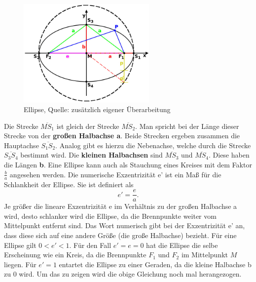 \begin{figure}[h]                                                                           %
	\centering                                                                            	%
	\includegraphics[width=0.6\textwidth]{./images/ellipse_new.jpg}                         %
	\caption[Ellipse]{Ellipse, Quelle: \cite{Wiki:Elli} zusätzlich eigener Überarbeitung}          %
	\label{fig:ellipse}                                                                     %
\end{figure}                                                                              	%
Die Strecke \ensuremath{\overline{MS_{1}}} ist gleich der Strecke \ensuremath{\overline{MS_{2}}}. Man spricht bei der Länge dieser Strecke von der \textbf{großen Halbachse a}. Beide Strecken ergeben zusammen die Hauptachse \ensuremath{\overline{S_{1}S_{2}}}. Analog gibt es hierzu die Nebenachse, welche durch die Strecke \ensuremath{\overline{S_{3}S_{4}}} bestimmt wird. Die \textbf{kleinen Halbachsen} sind \ensuremath{\overline{MS_{3}}} und \ensuremath{\overline{MS_{4}}}. Diese haben die Längen \textbf{b}. Eine Ellipse kann auch als Stauchung eines Kreises mit dem Faktor \ensuremath{\frac{b}{a}} angesehen werden. 
\newpar
Die numerische Exzentrizität e' ist ein Maß für die Schlankheit der Ellipse. Sie ist definiert als
\begin{equation}
	e'=\frac{e}{a}.
\end{equation}
Je größer die lineare Exzentrizität e im Verhältnis zu der großen Halbachse a wird, desto schlanker wird die Ellipse, da die Brennpunkte weiter vom Mittelpunkt entfernt sind. Das Wort numerisch gibt bei der Exzentrizität e' an, dass diese sich auf eine andere Größe (die große Halbachse) bezieht. Für eine Ellipse gilt \ensuremath{0 < e' < 1}. Für den Fall \ensuremath{e'=e=0} hat die Ellipse die selbe Erscheinung wie ein Kreis, da die Brennpunkte \ensuremath{F_1} und \ensuremath{F_2} im Mittelpunkt \ensuremath{M} liegen. Für \ensuremath{e'=1} entartet die Ellipse zu einer Geraden, da die kleine Halbachse b zu 0 wird. Um das zu zeigen wird die obige Gleichung noch mal herangezogen.
